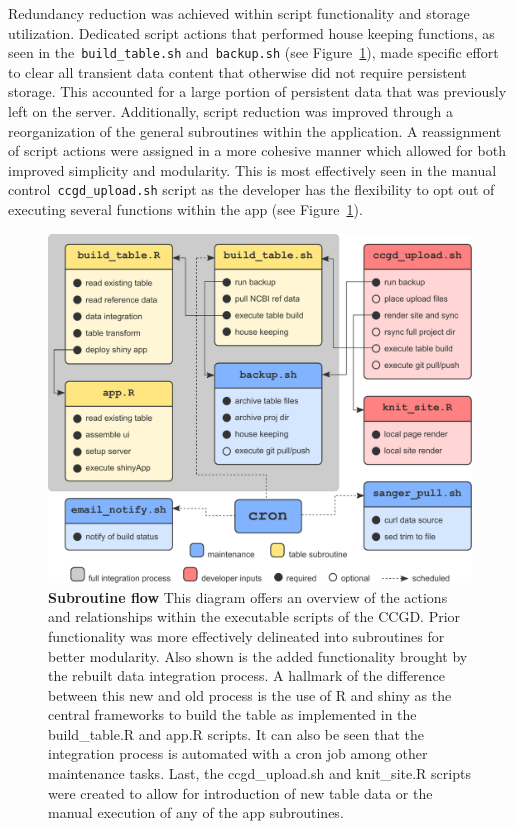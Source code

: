 \documentclass[10pt]{report}
\begin{document}
Redundancy reduction was achieved within script functionality and storage utilization. Dedicated script actions that performed house keeping functions, as seen in the~\texttt{build\_table.sh} and~\texttt{backup.sh} (see Figure~\ref{fig:subroutine}), made specific effort to clear all transient data content that otherwise did not require persistent storage. This accounted for a large portion of persistent data that was previously left on the server. Additionally, script reduction was improved through a reorganization of the general subroutines within the application. A reassignment of script actions were assigned in a more cohesive manner which allowed for both improved simplicity and modularity. This is most effectively seen in the manual control~\texttt{ccgd\_upload.sh} script as the developer has the flexibility to opt out of executing several functions within the app (see Figure~\ref{fig:subroutine}).

\begin{figure}[H]
    \centering
    \includegraphics[width=\textwidth]{fig/subroutine_flow.pdf}
    \caption[Subroutine flow]{\textbf{Subroutine flow} This diagram offers an overview of the actions and relationships within the executable scripts of the CCGD\@. Prior functionality was more effectively delineated into subroutines for better modularity. Also shown is the added functionality brought by the rebuilt data integration process. A hallmark of the difference between this new and old process is the use of R and shiny as the central frameworks to build the table as implemented in the build\_table.R and app.R scripts. It can also be seen that the integration process is automated with a cron job among other maintenance tasks. Last, the ccgd\_upload.sh and knit\_site.R scripts were created to allow for introduction of new table data or the manual execution of any of the app subroutines.}\label{fig:subroutine}
\end{figure}
\end{document}
